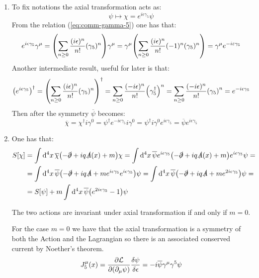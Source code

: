 \documentclass[11pt, oneside]{article}   	%
\begin{document}
\begin{enumerate}[label=\alph*)]

\item To fix notations the axial transformation acts as:
\[
	\psi \longmapsto \chi = e^{i \epsilon \gamma_5} \psi
\]
From the relation (\ref{eq:comm-gamma-5}) one has that:
\[
	e^{i\epsilon \gamma_5} \gamma^\mu = \qty( \sum_{n\ge0} \frac{(i\epsilon)^n}{n!} (\gamma_5)^n) \gamma^\mu = \gamma^\mu \qty( \sum_{n\ge0} \frac{(i\epsilon)^n}{n!} (-1)^n (\gamma_5)^n) = \gamma^\mu e^{-i\varepsilon \gamma_5}
\]
Another intermediate result, useful for later is that:
\[
	\qty(e^{i\epsilon \gamma_5})^\dagger = \qty( \sum_{n\ge0} \frac{(i\epsilon)^n}{n!} (\gamma_5)^n )^\dagger = \sum_{n\ge0} \frac{(-i\epsilon)^n}{n!} \qty(\gamma_5^\dagger)^n = \sum_{n\ge0} \frac{(-i\epsilon)^n}{n!} \qty(\gamma_5)^n = e^{-i\epsilon \gamma_5}
\]
Then after the symmetry $\overline{\psi}$ becomes:
\[
	\overline{\chi} = \chi^\dagger i \gamma^0 = \psi^\dagger e^{-i\epsilon \gamma_5} i\gamma^0 = \psi^\dagger i \gamma^0 e^{i\epsilon \gamma_5} = \overline{\psi} e^{i\epsilon \gamma_5}
\]

\item One has that:
\begin{align*}
	S[\chi] &= \int \dd[4]{x} \overline{\chi} \qty(- \slashed{\partial} + iq \slashed{A}(x) + m ) \chi = \int \dd[4]{x} \overline{\psi} e^{i\epsilon \gamma_5} \qty(- \slashed{\partial} + iq \slashed{A}(x) + m ) e^{i \epsilon \gamma_5} \psi = \\
	&= \int \dd[4]{x} \overline{\psi} \qty( -\slashed{\partial} + iq \slashed{A} + m e^{i \epsilon \gamma_5} e^{i \epsilon \gamma_5} ) \psi = \int \dd[4]{x} \overline{\psi} \qty( -\slashed{\partial} + iq \slashed{A} + m e^{2i \epsilon \gamma_5} ) \psi = \\
	&= S[\psi] + m \int \dd[4]{x} \overline{\psi} \qty( e^{2i \epsilon \gamma_5}  - 1 ) \psi
\end{align*}

The two actions are invariant under axial transformation if and only if $m=0$.

For the case $m=0$ we have that the axial transformation is a symmetry of both the Action and the Lagrangian so there is an associated conserved current by Noether's theorem. 
\[
	J^\mu_5(x) = \pdv{\mathcal{L}}{\qty(\partial_\mu \psi)} \fdv{\psi}{\epsilon} = -i\overline{\psi} \gamma^\mu \gamma^5 \psi
\]


\end{enumerate}
\end{document}
